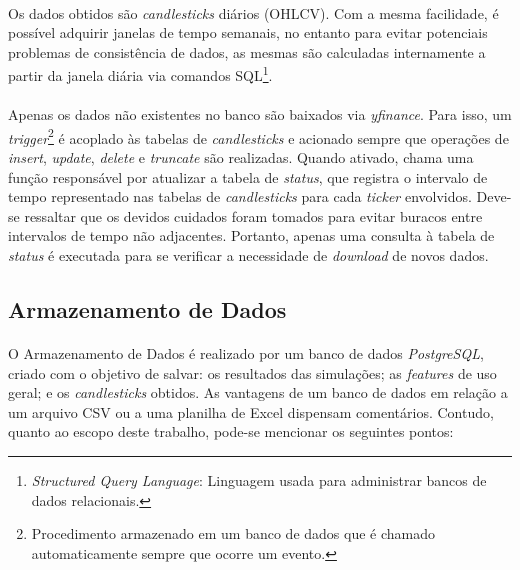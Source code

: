 \paragraph{} Os dados obtidos são \textit{candlesticks} diários (OHLCV). Com a mesma facilidade, é possível adquirir janelas de tempo semanais, no entanto para evitar potenciais problemas de consistência de dados, as mesmas são calculadas internamente a partir da janela diária via comandos SQL\footnote{\textit{Structured Query Language}: Linguagem usada para administrar bancos de dados relacionais.}.

\paragraph{} Apenas os dados não existentes no banco são baixados via \textit{yfinance}. Para isso, um \textit{trigger}\footnote{Procedimento armazenado em um banco de dados que é chamado automaticamente sempre que ocorre um evento.} é acoplado às tabelas de \textit{candlesticks} e acionado sempre que operações de \textit{insert}, \textit{update}, \textit{delete} e \textit{truncate} são realizadas. Quando ativado, chama uma função responsável por atualizar a tabela de \textit{status}, que registra o intervalo de tempo representado nas tabelas de \textit{candlesticks} para cada \textit{ticker} envolvidos. Deve-se ressaltar que os devidos cuidados foram tomados para evitar buracos entre intervalos de tempo não adjacentes. Portanto, apenas uma consulta à tabela de \textit{status} é executada para se verificar a necessidade de \textit{download} de novos dados.



\subsection{Armazenamento de Dados}

\paragraph{} O Armazenamento de Dados é realizado por um banco de dados \textit{PostgreSQL}, criado com o objetivo de salvar: os resultados das simulações; as \textit{features} de uso geral; e os \textit{candlesticks} obtidos. As vantagens de um banco de dados em relação a um arquivo CSV ou a uma planilha de Excel dispensam comentários. Contudo, quanto ao escopo deste trabalho, pode-se mencionar os seguintes pontos:

